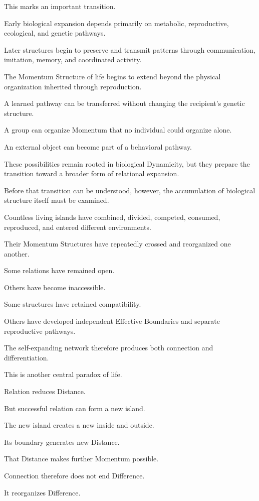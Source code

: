 This marks an important transition.

Early biological expansion depends primarily on metabolic, reproductive, ecological, and genetic pathways.

Later structures begin to preserve and transmit patterns through communication, imitation, memory, and coordinated activity.

The Momentum Structure of life begins to extend beyond the physical organization inherited through reproduction.

A learned pathway can be transferred without changing the recipient’s genetic structure.

A group can organize Momentum that no individual could organize alone.

An external object can become part of a behavioral pathway.

These possibilities remain rooted in biological Dynamicity, but they prepare the transition toward a broader form of relational expansion.

Before that transition can be understood, however, the accumulation of biological structure itself must be examined.

Countless living islands have combined, divided, competed, consumed, reproduced, and entered different environments.

Their Momentum Structures have repeatedly crossed and reorganized one another.

Some relations have remained open.

Others have become inaccessible.

Some structures have retained compatibility.

Others have developed independent Effective Boundaries and separate reproductive pathways.

The self-expanding network therefore produces both connection and differentiation.

This is another central paradox of life.

Relation reduces Distance.

But successful relation can form a new island.

The new island creates a new inside and outside.

Its boundary generates new Distance.

That Distance makes further Momentum possible.

Connection therefore does not end Difference.

It reorganizes Difference.

